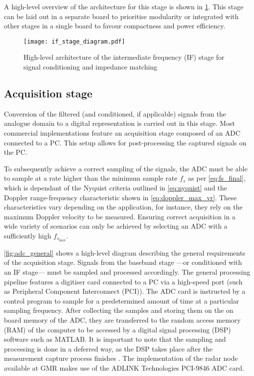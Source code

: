 A high-level overview of the architecture for this stage is shown in \cref{fig:if_general}. This stage can be laid out in a separate board to prioritise modularity or integrated with other stages in a single board to favour compactness and power efficiency.

\begin{figure}[ht]
	\centering
	\texttt{[image: if\_stage\_diagram.pdf]}
	\caption{High-level architecture of the intermediate frequency (IF) stage for signal conditioning and impedance matching \label{fig:if_general}}
\end{figure}

\subsection{Acquisition stage}

Conversion of the filtered (and conditioned, if applicable) signals from the analogue domain to a digital representation is carried out in this stage. Most commercial implementations feature an acquisition stage composed of an ADC connected to a PC. This setup allows for post-processing the captured signals on the PC.

To subsequently achieve a correct sampling of the signals, the ADC must be able to sample at a rate higher than the minimum sample rate $f_s$ as per \cref{eq:fs_final}, which is dependant of the Nyquist criteria outlined in \cref{eq:nyquist} and the Doppler range-frequency characteristic shown in \cref{eq:doppler_max_vr}. These characteristics vary depending on the application, for instance, they rely on the maximum Doppler velocity to be measured. Ensuring correct acquisition in a wide variety of scenarios can only be achieved by selecting an ADC with a sufficiently high $f_{s_{\max}}$.

\cref{fig:adc_general} shows a high-level diagram describing the general requirements of the acquisition stage. Signals from the baseband stage ---or conditioned with an IF stage--- must be sampled and processed accordingly. The general processing pipeline features a digitiser card connected to a PC via a high-speed port (such as Peripheral Component Interconnect (PCI)). The ADC card is instructed by a control program to sample for a predetermined amount of time at a particular sampling frequency. After collecting the samples and storing them on the on board memory of the ADC, they are transferred to the random access memory (RAM) of the computer to be accessed by a digital signal processing (DSP) software such as MATLAB. It is important to note that the sampling and processing is done in a deferred way, as the DSP takes place after the measurement capture process finishes \cite[p.~43-44]{ADLINKTechnologies2010}. The implementation of the radar node available at GMR makes use of the ADLINK Technologies PCI-9846 ADC card.

